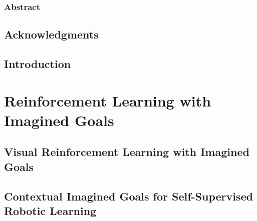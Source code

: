 \documentclass[ titlepage,numbers=noenddot,headinclude,
                footinclude=true,cleardoublepage=empty,abstractoff,
                BCOR=5mm,paper=letter,fontsize=12pt,
                american,
                openany
                ]{scrreprt}
\newcommand\blankpage{%
    \null
    \thispagestyle{empty}%
    \addtocounter{page}{-1}%
    \newpage}
\begin{document}
\frenchspacing
\raggedbottom
{}




\afterpage{\blankpage}

\setcounter{page}{1}
\section*{Abstract}

\newpage

\setcounter{page}{1}%

\begingroup
\let\clearpage\relax
\let\cleardoublepage\relax
\let\cleardoublepage\relax
\chapter*{Acknowledgments}

\endgroup


\pagestyle{firstpage}



\setcounter{page}{1}

\chapter{Introduction}\label{chapter:intro}



\part{Reinforcement Learning with Imagined Goals}

\chapter{Visual Reinforcement Learning with Imagined Goals}\label{chapter:rig}


\chapter{Contextual Imagined Goals for Self-Supervised Robotic Learning}\label{chapter:ccrig}
\end{document}
